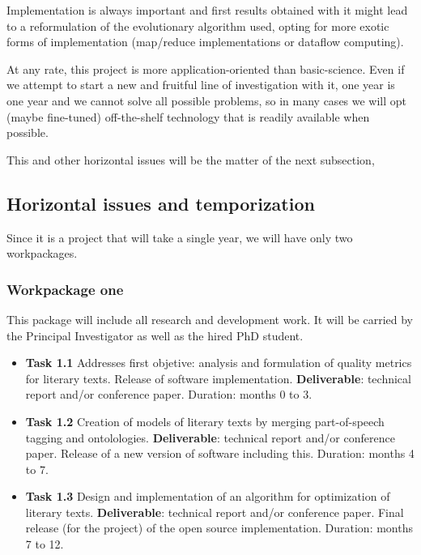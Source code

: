 \documentclass[a4paper,12pt,twocolumn]{article}
\begin{document}
Implementation is always important
\cite{DBLP:conf/iwann/MereloRACML11} and first results obtained with
it might lead to a reformulation
of the evolutionary algorithm used, opting for more exotic forms of
implementation (map/reduce implementations or dataflow computing). 

At any rate, this project is more application-oriented than
basic-science. Even if we attempt to start a new and fruitful line of
investigation with it, one year is one year and we cannot solve all
possible problems, so in many cases we will opt (maybe fine-tuned)
off-the-shelf technology that is readily available when possible.

This and other horizontal issues will be the matter of the next
subsection,

\subsection{Horizontal issues and temporization}

Since it is a project that will take a single year, we will have only
two workpackages.

\subsubsection{Workpackage one}

This package will include all research and development work. It will
be carried by the Principal Investigator as well as the hired PhD
student.

\begin{itemize}
\item {\bf Task 1.1} Addresses first objetive: analysis and formulation of
  quality metrics for literary texts. Release of software implementation.
 {\bf Deliverable}: technical
  report and/or conference paper. Duration: months 0 to 3.
\item {\bf Task 1.2} Creation of models of literary texts by merging
  part-of-speech tagging and ontolologies. {\bf Deliverable}: technical
  report and/or conference paper.  Release of a new version of
  software including this. Duration: months 4 to 7. 
\item {\bf Task 1.3} Design and implementation of an algorithm for
  optimization of literary texts. {\bf Deliverable}: technical
  report and/or conference paper. Final release (for the project) of
  the open source implementation.  Duration: months 7 to 12.
\end{itemize}
\end{document}
